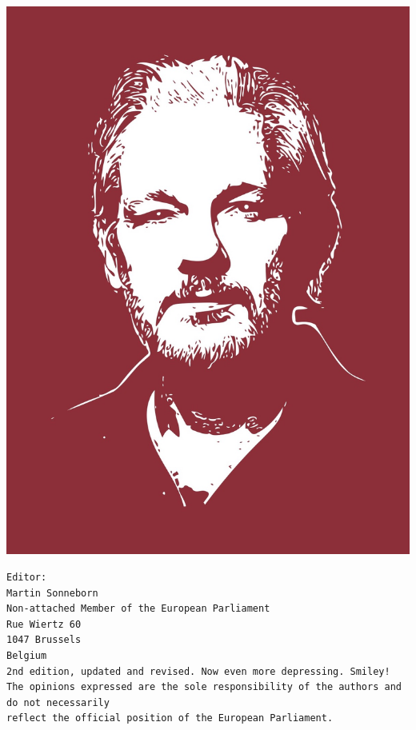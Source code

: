 \newpage
\pagecolor{assangered}\afterpage{\nopagecolor}
\includegraphics[width=180mm]{assange.jpg}

\newpage
\thispagestyle{empty} %
\vspace*{\fill}
\begin{verbatim}
Editor:
Martin Sonneborn
Non-attached Member of the European Parliament
Rue Wiertz 60
1047 Brussels
Belgium
2nd edition, updated and revised. Now even more depressing. Smiley!
The opinions expressed are the sole responsibility of the authors and do not necessarily 
reflect the official position of the European Parliament.
\end{verbatim}
